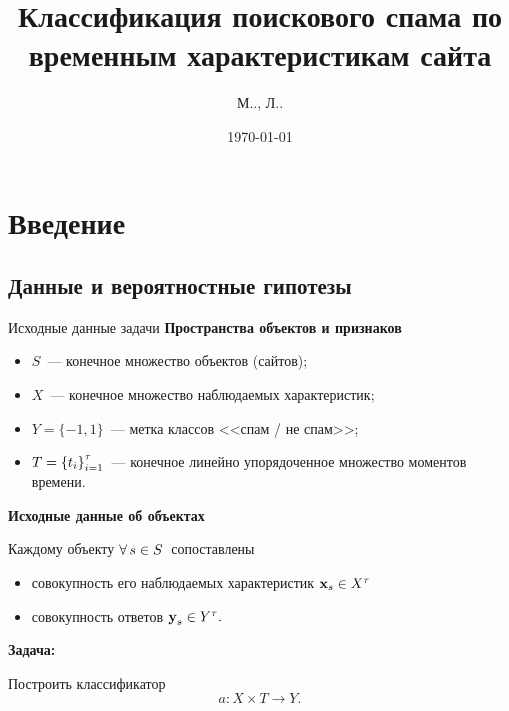 \documentclass[unicode,lefteqn,c,hyperref={pdfpagelabels=false}]{beamer}
\title[\hbox to 56mm{Классификация поискового спама\hfill\insertframenumber\,/\,\inserttotalframenumber}]{Классификация поискового спама по временным характеристикам сайта}
\author{М.\shortspaceО.\shortspaceБурмистров, Л.\shortspaceН.\shortspaceСандуляну} %
\institute{
		\vfill Московский физико-технический институт
		\vfill Факультет управления и прикладной математики
		\vfill Кафедра интеллектуальных систем}
\date{\today}
\begin{document}
\begin{frame}
    \titlepage
\end{frame}
\section{Введение}
\subsection{Данные и вероятностные гипотезы}
\begin{frame}{Исходные данные задачи}
    \textbf{Пространства объектов и признаков}
    \begin{itemize}
    	\item $S$~--- конечное множество объектов (сайтов);
    	\item $X$~--- конечное множество наблюдаемых характеристик;
   		\item $Y = \{-1, 1\}$~--- метка классов <<спам / не спам>>;%
		\item $T =\left\{t_i\right\}_{i=1}^{\tau}$~--- конечное линейно упорядоченное множество моментов времени.
    \end{itemize}

    \smallskip
    \textbf{Исходные данные об объектах} \par
	Каждому объекту $\forall\,s\in S\:$ сопоставлены
    \begin{itemize}
        \item совокупность его наблюдаемых характеристик $\textbf{x}_s \in X^{\tau}$ %
        \item совокупность ответов $\textbf{y}_s \in Y^{\tau}. $
    \end{itemize}

    \smallskip
    \textbf{Задача:} \par
	Построить классификатор
	\[
		a\colon X\times T \to Y.
	\] 	
\end{frame}
\end{document}
